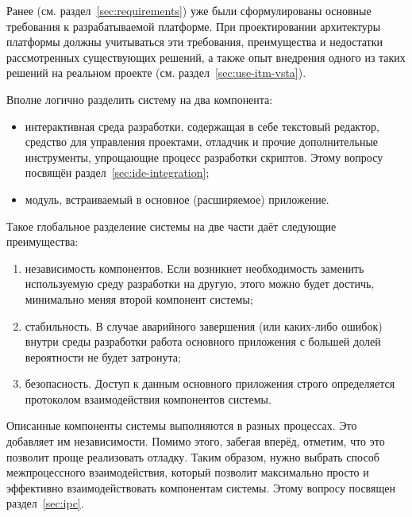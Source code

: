 Ранее (см. раздел~\ref{sec:requirements}) уже были сформулированы основные требования к разрабатываемой платформе. При проектировании архитектуры платформы должны учитываться эти требования, преимущества и недостатки рассмотренных существующих решений, а также опыт внедрения одного из таких решений на реальном проекте (см. раздел~\ref{sec:use-itm-vsta}).

Вполне логично разделить систему на два компонента:
\begin{itemize}
 \item интерактивная среда разработки, содержащая в себе текстовый редактор, средство для управления проектами, отладчик и прочие дополнительные инструменты, упрощающие процесс разработки скриптов. Этому вопросу посвящён раздел~\ref{sec:ide-integration};
 \item модуль, встраиваемый в основное (расширяемое) приложение.
\end{itemize}

Такое глобальное разделение системы на две части даёт следующие преимущества:
\begin{enumerate}
 \item независимость компонентов. Если возникнет необходимость заменить используемую среду разработки на другую, этого можно будет достичь, минимально меняя второй компонент системы;
 \item стабильность. В случае аварийного завершения (или каких-либо ошибок) внутри среды разработки работа основного приложения с большей долей вероятности не будет затронута;
 \item безопасность. Доступ к данным основного приложения строго определяется протоколом взаимодействия компонентов системы.
\end{enumerate}

Описанные компоненты системы выполняются в разных процессах. Это добавляет им независимости. Помимо этого, забегая вперёд, отметим, что это позволит проще реализовать отладку. Таким образом, нужно выбрать способ межпроцессного взаимодействия, который позволит максимально просто и эффективно взаимодействовать компонентам системы. Этому вопросу посвящен раздел~\ref{sec:ipc}.
